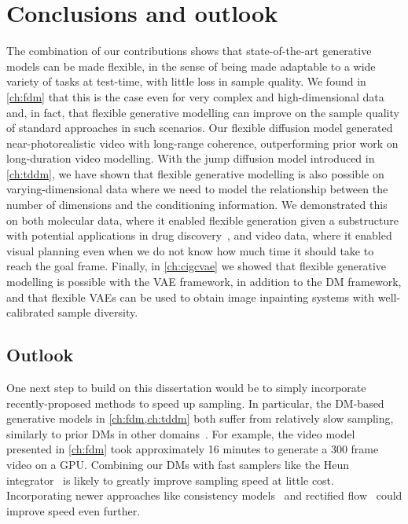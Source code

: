 \chapter{Conclusions and outlook}  \label{ch:conclusion}

The combination of our contributions shows that state-of-the-art generative models can be made flexible, in the sense of being made adaptable to a wide variety of tasks at test-time, with little loss in sample quality. 
%
We found in \cref{ch:fdm} that this is the case even for very complex and high-dimensional data and, in fact, that flexible generative modelling can improve on the sample quality of standard approaches in such scenarios. Our flexible diffusion model generated near-photorealistic video with long-range coherence, outperforming prior work on long-duration video modelling.
%
With the jump diffusion model introduced in \cref{ch:tddm}, we have shown that flexible generative modelling is also possible on varying-dimensional data where we need to model the relationship between the number of dimensions and the conditioning information. We demonstrated this on both molecular data, where it enabled flexible generation given a substructure with potential applications in drug discovery~\citep{hoogeboom2022equivariant}, and video data, where it enabled visual planning even when we do not know how much time it should take to reach the goal frame.
%
Finally, in \cref{ch:cigcvae} we showed that flexible generative modelling is possible with the VAE framework, in addition to the DM framework, and that flexible VAEs can be used to obtain image inpainting systems with well-calibrated sample diversity.


\section*{Outlook}

One next step to build on this dissertation would be to simply incorporate recently-proposed methods to speed up sampling. In particular, the DM-based generative models in \cref{ch:fdm,ch:tddm} both suffer from relatively slow sampling, similarly to prior DMs in other domains~\citep{ho2020denoising,song2020score}. For example, the video model presented in \cref{ch:fdm} took approximately 16 minutes to generate a 300 frame video on a GPU.  Combining our DMs with fast samplers like the Heun integrator~\citep{karras2022elucidating} is likely to greatly improve sampling speed at little cost. Incorporating newer approaches like consistency models~\citep{song2023consistency} and rectified flow~\citep{esser2024scaling} could improve speed even further. 

